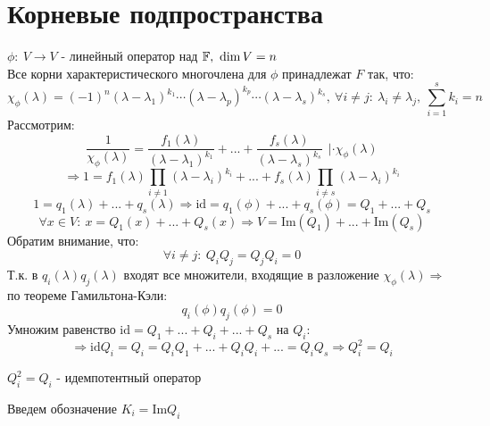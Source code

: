 \section{Корневые подпространства}
    $\phi:\ V \to V$ - линейный оператор над $\mathbb{F}, \ \dim V = n$\\
    Все корни характеристического многочлена для $\phi$ принадлежат $F$ так, что:
    $$\chi_\phi(\lambda) = (-1)^n(\lambda-\lambda_1)^{k_1} \cdots (\lambda - \lambda_p)^{k_p}\cdots (\lambda-\lambda_s)^{k_s}, \ \forall i \neq j: \  \lambda_i \neq \lambda_j, \ \sum \limits_{i=1}^sk_i = n$$
    Рассмотрим: 
    $$\frac{1}{\chi_\phi(\lambda)} = \frac{f_1(\lambda)}{(\lambda-\lambda_1)^{k_1}} + ... + \frac{f_s(\lambda)}{(\lambda-\lambda_s)^{k_s}} \ \ | \cdot \chi_\phi(\lambda)$$ $$\Longrightarrow 1 = f_1 (\lambda) \prod\limits_{i\neq 1}(\lambda-\lambda_i)^{k_i} + ... + f_s (\lambda) \prod\limits_{i\neq s}(\lambda-\lambda_i)^{k_i}$$
    $$1= q_1(\lambda) + ... + q_s(\lambda) \Longrightarrow  \text{id} = q_1(\phi) + ... + q_s(\phi) = Q_1 + ... + Q_s$$
    $$\forall x \in V: \ x=Q_1(x) + ... + Q_s(x) \Longrightarrow V = \text{Im} (Q_1) + ... + \text{Im} (Q_s)$$
    Обратим внимание, что:
    $$\forall i \neq j: \ Q_iQ_j = Q_jQ_i = 0$$
    Т.к. в $q_i(\lambda)q_j(\lambda)$ входят все множители, входящие в разложение $\chi_\phi(\lambda) \Longrightarrow $ по теореме Гамильтона-Кэли: 
    $$q_i(\phi)q_j(\phi) = 0$$
    Умножим равенство $\text{id} = Q_1+...+Q_i+...+Q_s$ на $Q_i:$ $$\Longrightarrow \text{id}Q_i = Q_i = Q_iQ_1+...+Q_iQ_i+...=Q_iQ_s \Longrightarrow Q_i^2 = Q_i$$
    \begin{definition}
        $Q_i^2 = Q_i$ - идемпотентный оператор
    \end{definition}  
    
    Введем обозначение $K_i = \text{Im}Q_i$
    
